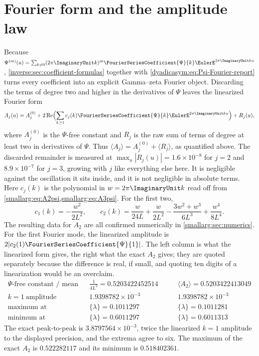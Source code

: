 \documentclass[11pt,oneside]{article}
\theoremstyle{definition}
\theoremstyle{remark}
\begin{document}
\section{Fourier form and the amplitude law}\label{smallarg:sec:fourier}

Because
$\Psi^{(m)}(u)=\sum_{k\ne0}(2\pi\ImaginaryUnit k)^m
\FourierSeriesCoefficient{\Psi}{k}\EulerE^{2\pi\ImaginaryUnit ku}$,
\cref{inverse:sec:coefficient-formulas} together with \cref{dyadicasym:eq:Psi-Fourier-report} turns every coefficient into
an explicit Gamma--zeta Fourier object.  Discarding the terms of degree two
and higher in the derivatives of $\Psi$ leaves the linearized Fourier form
\[
  A_j(u)=A_j^{(0)}
   +2\operatorname{Re}\Bigl(\sum_{k\ge1}c_j(k)
   \FourierSeriesCoefficient{\Psi}{k}\EulerE^{2\pi\ImaginaryUnit ku}\Bigr)
   +R_j(u),
\]
where \(A_j^{(0)}\) is the \(\Psi\)-free constant and \(R_j\) is the raw sum of
terms of degree at least two in derivatives of \(\Psi\).  Thus
\(\langle A_j\rangle=A_j^{(0)}+\langle R_j\rangle\), as quantified above.  The
discarded remainder is measured at
$\max_u|R_j(u)|=1.6\times10^{-8}$ for $j=2$ and $8.9\times10^{-7}$ for
$j=3$, growing with $j$ like everything else here.  It is negligible against
the oscillation it sits inside, and it is not negligible in absolute terms.
Here $c_j(k)$ is the polynomial in $w=2\pi\ImaginaryUnit k$ read off from
\cref{smallarg:eq:A2psi,smallarg:eq:A3psi}.  For the first two,
\[
  c_1(k)=-\frac{w^2}{2L^2},
  \qquad
  c_2(k)=\frac{w}{24L}+\frac{w}{2L^2}-\frac{3w^2+w^3}{6L^3}+\frac{w^4}{8L^4}.
\]
The resulting data for $A_2$ are all confirmed numerically in
\cref{smallarg:sec:numerics}.
For the first Fourier mode, the linearized amplitude is
$2|c_2(1)\FourierSeriesCoefficient{\Psi}{1}|$.  The left column is what the linearized
form gives, the right what the exact
$A_2$ gives; they are quoted separately because the difference is real, if
small, and quoting ten digits of a linearization would be an overclaim.
\[
\begin{aligned}
  \text{\(\Psi\)-free constant / mean}&&\tfrac1{4L^2}=0.5203422452514&\qquad
    \langle A_2\rangle=0.5203422413049\\
  k=1\ \text{amplitude}&&1.9398782\times10^{-3}&\qquad
    1.9398782\times10^{-3}\\
  \text{maximum at}&&\{\lambda\}=0.1011297&\qquad\{\lambda\}=0.1011281\\
  \text{minimum at}&&\{\lambda\}=0.6011297&\qquad\{\lambda\}=0.6011313
\end{aligned}
\]
The exact peak-to-peak is $3.8797564\times10^{-3}$, twice the linearized
$k=1$ amplitude to the displayed precision, and the extrema agree to six.  The
maximum of the exact $A_2$ is $0.522282117$ and its minimum is
$0.518402361$.
\end{document}
